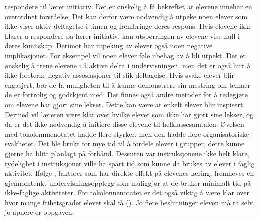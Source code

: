 \documentclass[main.tex]{subfiles}
\begin{document}
respondere til lærer initiativ. Det er ønskelig å få bekreftet at elevene innehar en overordnet 
forståelse. Det kan derfor være nødvendig å utpeke noen elever som ikke viser aktiv deltagelse i 
timen og frembringe deres respons. Hvis elevene ikke klarer å respondere på lærer initiativ, kan 
utspørringen av elevene vise hull i deres kunnskap. Derimot har utpeking av elever også noen 
negative implikasjoner. For eksempel vil noen elever føle ubehag av å bli utpekt. Det er ønskelig å 
trene elevene i å aktive delta i undervisningen, men det er også lurt å ikke forsterke negativ 
assosiasjoner til slik deltagelse. Hvis svake elever blir engasjert, bør de få muligheten til å 
kunne demonstrere sin mestring om temaer de er fortrolig og godtkjent med. Det finnes også andre 
metoder for å redegjøre om elevene har gjort sine lekser. Dette kan være at enkelt elever blir 
inspisert. Dermed vil læreren være klar over hvilke elever som ikke har gjort sine lekser, og da er 
det ikke nødvendig å initiere disse elevene til helklassesamtalen.
\newline
\newline
Øvelsen med tokolonnnenotatet hadde flere styrker, men den 
hadde flere organisatoriske svakheter. Det ble brukt for mye tid til å fordele elever i grupper, 
dette kunne gjerne ha blitt planlagt på forhånd. Dessuten var instruksjonene ikke helt klare, 
tydelighet i instruksjoner ville ha spart tid som kunne da brukes av elever i faglig aktivitet. 
Ifølge , faktorer som har direkte effekt på elevenes læring, fremheves en 
gjennomtenkt undervisningsopplegg som muliggjør at de bruker minimalt tid på ikke-faglige 
aktiviteter. For tokolonnenotatet er det også viktig å være klar over hvor mange 
frihetsgrader elever skal få (). Jo flere beslutninger eleven må ta selv, jo åpnere 
er oppgaven.
\end{document}
